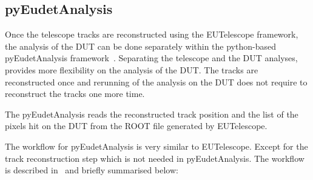 \subsection{pyEudetAnalysis}
\label{sec:pyEudetAnalysis}

Once the telescope tracks are reconstructed using the EUTelescope
framework, the analysis of the DUT can be done separately within the
python-based pyEudetAnalysis framework~\cite{pyeudet}. Separating the
telescope and the DUT analyses, provides more flexibility on the
analysis of the DUT. The tracks are reconstructed once and rerunning
of the analysis on the DUT does not require to reconstruct the tracks
one more time.

The pyEudetAnalysis reads the reconstructed track position and the
list of the pixels hit on the DUT from the ROOT file generated by
EUTelescope.
 
The workflow for pyEudetAnalysis is very similar to
EUTelescope. Except for the track reconstruction step which is not
needed in pyEudetAnalysis. The workflow is described
in~\cite{AlipourTehrani:2133128} and briefly summarised below:

